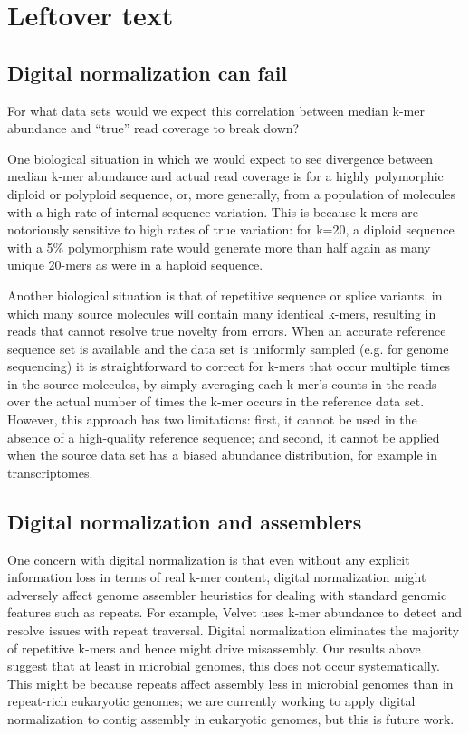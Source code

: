 \documentclass[10pt]{article}
\begin{document}
\section*{Leftover text}

\subsection*{Digital normalization can fail}

For what data sets would we expect this correlation between median
k-mer abundance and ``true'' read coverage to break down?

One biological situation in which we would expect to see divergence
between median k-mer abundance and actual read coverage is for a
highly polymorphic diploid or polyploid sequence, or, more generally,
from a population of molecules with a high rate of internal sequence
variation.  This is because k-mers are notoriously sensitive to high
rates of true variation: for k=20, a diploid sequence with a 5\%
polymorphism rate would generate more than half again as many unique
20-mers as were in a haploid sequence.

Another biological situation is that of repetitive sequence or splice
variants, in which many source molecules will contain many identical
k-mers, resulting in reads that cannot resolve true novelty from errors.  When an accurate reference sequence set is available and the
data set is uniformly sampled (e.g. for genome sequencing) it is
straightforward to correct for k-mers that occur multiple times in the
source molecules, by simply averaging each k-mer's counts in the reads
over the actual number of times the k-mer occurs in the reference data
set.  However, this approach has two limitations: first, it cannot be
used in the absence of a high-quality reference sequence; and second,
it cannot be applied when the source data set has a biased abundance
distribution, for example in transcriptomes.

\subsection*{Digital normalization and assemblers}

One concern with digital normalization is that even without any
explicit information loss in terms of real k-mer content, digital
normalization might adversely affect genome assembler heuristics for
dealing with standard genomic features such as repeats.  For example,
Velvet uses k-mer abundance to detect and resolve issues with repeat
traversal.  Digital normalization eliminates the majority of
repetitive k-mers and hence might drive misassembly. Our results above
suggest that at least in microbial genomes, this does not occur
systematically.  This might be because repeats affect assembly less in
microbial genomes than in repeat-rich eukaryotic genomes; we are
currently working to apply digital normalization to contig assembly in
eukaryotic genomes, but this is future work.
\end{document}
